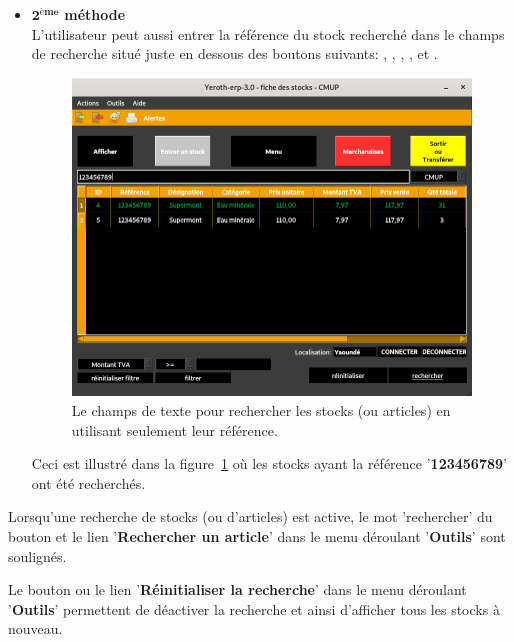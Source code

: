 \begin{itemize}[]
	\newpage	
	
	\item \textcolor{purplish}{$\mathbf{2^{\text{\`eme}}}$ \textbf{m\'ethode}}\\
	L'utilisateur peut aussi entrer la r\'ef\'erence
	du stock recherch\'e dans le champs	de recherche
	situ\'e juste en dessous des boutons
	suivants: , ,
	, , et .\\
		
	\begin{figure}[!htbp]
		\centering
		\includegraphics[scale=0.63]{images/yeren-fenetre-rechercher-stock-par-reference.png}
		\caption{Le champs de texte pour
			rechercher les stocks (ou articles) en utilisant
			seulement leur r\'ef\'erence.}\label{fig:yeren-fenetre-rechercher-stock-par-reference}
	\end{figure}
	
	Ceci est illustr\'e dans la figure~\ref{fig:yeren-fenetre-rechercher-stock-par-reference}
	o\`u les stocks ayant la r\'ef\'erence '\textbf{123456789}'
	ont \'et\'e recherch\'es.\\	
\end{itemize}

Lorsqu'une recherche de stocks (ou d'articles) est active,
le mot 'rechercher' du bouton  et
le lien '\textbf{Rechercher un article}' dans le
menu d\'eroulant '\textbf{Outils}' sont soulign\'es.
	
Le bouton  ou le lien
'\textbf{R\'einitialiser la recherche}' dans le menu 
d\'eroulant '\textbf{Outils}' permettent de d\'eactiver
la recherche et ainsi d'afficher tous les stocks
\`a nouveau.

